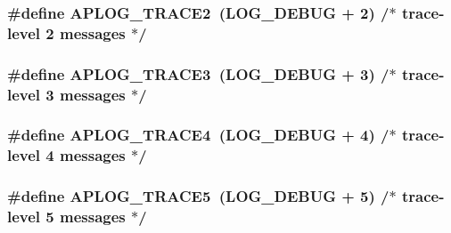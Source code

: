 \subsubsection[{\texorpdfstring{A\+P\+L\+O\+G\+\_\+\+T\+R\+A\+C\+E2}{APLOG_TRACE2}}]{\setlength{\rightskip}{0pt plus 5cm}\#define A\+P\+L\+O\+G\+\_\+\+T\+R\+A\+C\+E2~(L\+O\+G\+\_\+\+D\+E\+B\+UG + 2)  /$\ast$ trace-\/{\bf level} 2 messages $\ast$/}\hypertarget{group__APACHE__CORE__LOG_gaaa69603638ba4a5d83b8727a1ca5b76a}{}\label{group__APACHE__CORE__LOG_gaaa69603638ba4a5d83b8727a1ca5b76a}
\subsubsection[{\texorpdfstring{A\+P\+L\+O\+G\+\_\+\+T\+R\+A\+C\+E3}{APLOG_TRACE3}}]{\setlength{\rightskip}{0pt plus 5cm}\#define A\+P\+L\+O\+G\+\_\+\+T\+R\+A\+C\+E3~(L\+O\+G\+\_\+\+D\+E\+B\+UG + 3)  /$\ast$ trace-\/{\bf level} 3 messages $\ast$/}\hypertarget{group__APACHE__CORE__LOG_ga5e4f134ae2203dd339774d9549d814db}{}\label{group__APACHE__CORE__LOG_ga5e4f134ae2203dd339774d9549d814db}
\subsubsection[{\texorpdfstring{A\+P\+L\+O\+G\+\_\+\+T\+R\+A\+C\+E4}{APLOG_TRACE4}}]{\setlength{\rightskip}{0pt plus 5cm}\#define A\+P\+L\+O\+G\+\_\+\+T\+R\+A\+C\+E4~(L\+O\+G\+\_\+\+D\+E\+B\+UG + 4)  /$\ast$ trace-\/{\bf level} 4 messages $\ast$/}\hypertarget{group__APACHE__CORE__LOG_ga479289550d998526187ff78880378f9c}{}\label{group__APACHE__CORE__LOG_ga479289550d998526187ff78880378f9c}
\subsubsection[{\texorpdfstring{A\+P\+L\+O\+G\+\_\+\+T\+R\+A\+C\+E5}{APLOG_TRACE5}}]{\setlength{\rightskip}{0pt plus 5cm}\#define A\+P\+L\+O\+G\+\_\+\+T\+R\+A\+C\+E5~(L\+O\+G\+\_\+\+D\+E\+B\+UG + 5)  /$\ast$ trace-\/{\bf level} 5 messages $\ast$/}\hypertarget{group__APACHE__CORE__LOG_gab1a4bc833fc60cfbb6bc89eaa6550a2c}{}\label{group__APACHE__CORE__LOG_gab1a4bc833fc60cfbb6bc89eaa6550a2c}
